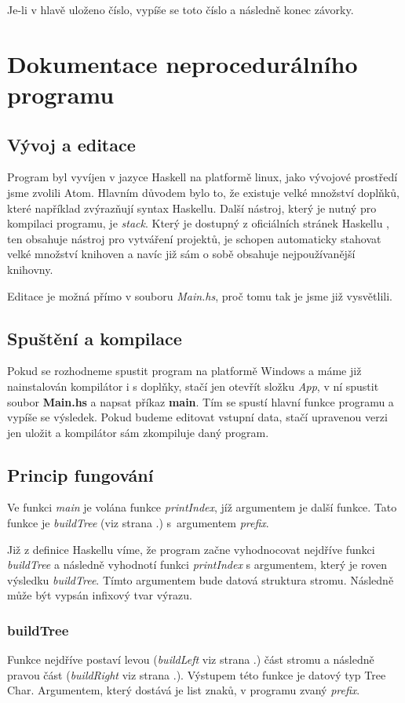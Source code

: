 \documentclass[12pt,a4paper]{report}
\begin{document}
Je-li v hlavě uloženo číslo, vypíše se toto číslo a následně konec závorky.
\newpage
\section{Dokumentace neprocedurálního programu}
\subsection{Vývoj a editace}
Program byl vyvíjen v jazyce Haskell na platformě linux, jako vývojové prostředí jsme zvolili Atom. Hlavním důvodem bylo to, že existuje velké množství doplňků, které například zvýrazňují syntax Haskellu. Další nástroj, který je nutný pro kompilaci programu, je \textit{stack}. Který je dostupný z oficiálních stránek Haskellu \cite{stack}, ten obsahuje nástroj pro vytváření projektů, je schopen automaticky stahovat velké množství knihoven a navíc již sám o sobě obsahuje nejpoužívanější knihovny.
 
Editace je možná přímo v souboru \textit{Main.hs}, proč tomu tak je jsme již vysvětlili.  

\subsection{Spuštění a kompilace}
Pokud se rozhodneme spustit program na platformě Windows a máme již nainstalován kompilátor i s doplňky, stačí jen otevřít složku \textit{App}, v ní spustit soubor \textbf{Main.hs} a napsat příkaz \textbf{main}. Tím se spustí hlavní funkce programu a vypíše se výsledek. Pokud budeme editovat vstupní data, stačí upravenou verzi jen uložit a kompilátor sám zkompiluje daný program. 
 
\subsection{Princip fungování}
Ve funkci \textit{main} je volána funkce \textit{printIndex}, jíž argumentem je další funkce. Tato funkce je \textit{buildTree} (viz strana \pageref{buildTree}.) s~argumentem \textit{prefix}.

Již z definice Haskellu víme, že program začne vyhodnocovat nejdříve funkci \textit{buildTree} a následně vyhodnotí funkci \textit{printIndex} s argumentem, který je roven výsledku \textit{buildTree}. Tímto argumentem bude datová struktura stromu. Následně může být vypsán infixový tvar výrazu.  

\subsubsection{buildTree} \label{buildTree}
Funkce nejdříve postaví levou (\textit{buildLeft} viz strana \pageref{buildLeft}.) část stromu a následně pravou část  (\textit{buildRight} viz strana \pageref{buildRight}.). Výstupem této funkce je datový typ Tree Char. Argumentem, který dostává je list znaků, v programu zvaný \textit{prefix}.
\end{document}
